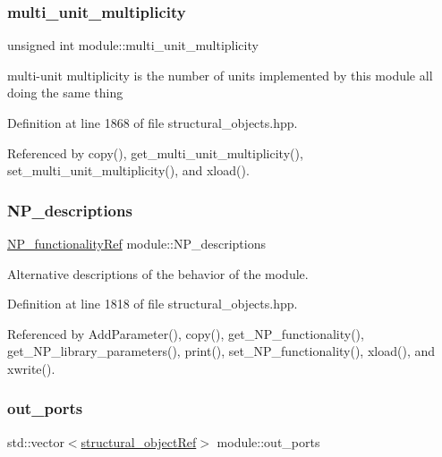 \subsubsection{\texorpdfstring{multi\+\_\+unit\+\_\+multiplicity}{multi\_unit\_multiplicity}}
{\footnotesize\ttfamily unsigned int module\+::multi\+\_\+unit\+\_\+multiplicity\hspace{0.3cm}{\ttfamily [private]}}



multi-\/unit multiplicity is the number of units implemented by this module all doing the same thing 



Definition at line 1868 of file structural\+\_\+objects.\+hpp.



Referenced by copy(), get\+\_\+multi\+\_\+unit\+\_\+multiplicity(), set\+\_\+multi\+\_\+unit\+\_\+multiplicity(), and xload().

\mbox{\label{classmodule_a4277830832806c906445867354a3328c}} 
\subsubsection{\texorpdfstring{N\+P\+\_\+descriptions}{NP\_descriptions}}
{\footnotesize\ttfamily \hyperlink{NP__functionality_8hpp_aacd74315d343c1054cd3c01e18627049}{N\+P\+\_\+functionality\+Ref} module\+::\+N\+P\+\_\+descriptions\hspace{0.3cm}{\ttfamily [private]}}



Alternative descriptions of the behavior of the module. 



Definition at line 1818 of file structural\+\_\+objects.\+hpp.



Referenced by Add\+Parameter(), copy(), get\+\_\+\+N\+P\+\_\+functionality(), get\+\_\+\+N\+P\+\_\+library\+\_\+parameters(), print(), set\+\_\+\+N\+P\+\_\+functionality(), xload(), and xwrite().

\mbox{\label{classmodule_a772cf68eccb72960057992f44c1fe311}} 
\subsubsection{\texorpdfstring{out\+\_\+ports}{out\_ports}}
{\footnotesize\ttfamily std\+::vector$<$\hyperlink{structural__objects_8hpp_a8ea5f8cc50ab8f4c31e2751074ff60b2}{structural\+\_\+object\+Ref}$>$ module\+::out\+\_\+ports\hspace{0.3cm}{\ttfamily [private]}}



